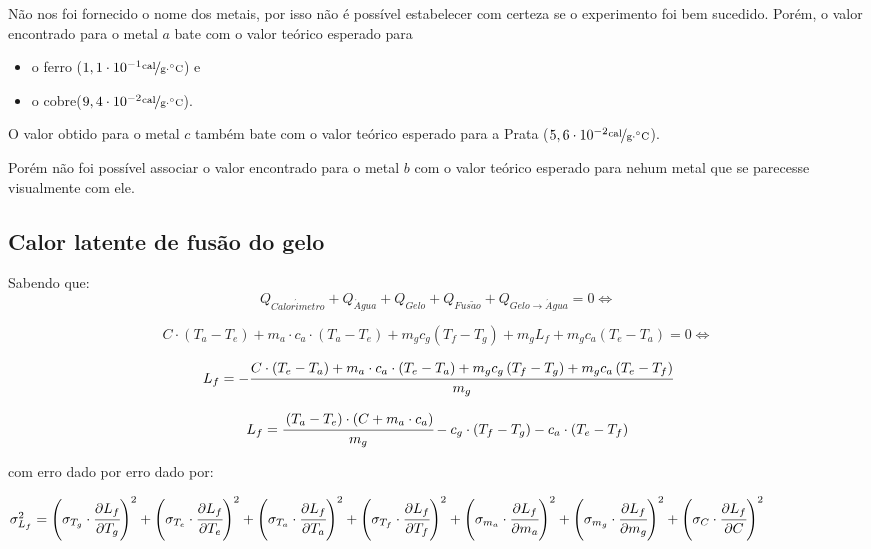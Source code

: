 \documentclass[a4paper]{article}
\begin{document}
				Não nos foi fornecido o nome dos metais, por isso não é possível estabelecer
				com certeza se o experimento foi bem sucedido. Porém, o valor encontrado
				para o metal $a$ bate com o valor teórico esperado para 
				\begin{itemize}
					\item o ferro ($1,1\cdot10^{-1}\unitfrac{cal}{g\cdot^{\circ}C}$) e 
					\item o cobre($9,4\cdot10^{-2}\unitfrac{cal}{g\cdot^{\circ}C}$). 
				\end{itemize}
				O valor obtido para o metal $c$ também bate com o valor teórico esperado
				para a Prata ($5,6\cdot10^{-2}\unitfrac{cal}{g\cdot^{\circ}C}$).

				Porém não foi possível associar o valor encontrado para o metal $b$
				com o valor teórico esperado para nehum metal que se parecesse visualmente
				com ele.

		\subsection{Calor latente de fusão do gelo}

			Sabendo que: 
			\begin{equation}
				Q_{Calor\acute{i}metro}+
				Q_{\acute{A}gua}+Q_{Gelo}+
				Q_{Fus\tilde{a}o}+Q_{Gelo\rightarrow\acute{A}gua}=0 
				\Leftrightarrow
			\end{equation}


			\[
				C\cdot\left(T_{a}-T_{e}\right)+
				m_{a}\cdot c_{a}\cdot\left(T_{a}-T_{e}\right)+
				m_{g}c_{g}\left(T_{f}-T_{g}\right)+m_{g}L_{f}+
				m_{g}c_{a}\left(T_{e}-T_{a}\right)=0
				\Leftrightarrow
			\]


			\[
				L_{f} = - \cfrac{
									C\cdot\left(T_{e}-T_{a}\right)+
									m_{a}\cdot c_{a}\cdot\left(T_{e}-T_{a}\right)+
									m_{g}c_{g}\left(T_{f}-T_{g}\right)+
									m_{g}c_{a}\left(T_{e}-T_{f}\right)
								}
								{m_{g}}
			\]


			\begin{equation}
				L_{f} = \cfrac{\left(T_{a}-T_{e}\right)\cdot\left(C+m_{a}\cdot c_{a}\right)}{m_{g}}-c_{g}\cdot\left(T_{f}-T_{g}\right)-c_{a}\cdot\left(T_{e}-T_{f}\right)
			\end{equation}


			com erro dado por erro dado por:

			$
			\sigma_{L_{f}}^{2}=
				\left(\sigma_{T_{g}}\cdot\cfrac{\partial L_{f}}{\partial T_{g}}\right)^{2}+
				\left(\sigma_{T_{e}}\cdot\cfrac{\partial L_{f}}{\partial T_{e}}\right)^{2}+
				\left(\sigma_{T_{a}}\cdot\cfrac{\partial L_{f}}{\partial T_{a}}\right)^{2}+
				\left(\sigma_{T_{f}}\cdot\cfrac{\partial L_{f}}{\partial T_{f}}\right)^{2}+
				\left(\sigma_{m_{a}}\cdot\cfrac{\partial L_{f}}{\partial m_{a}}\right)^{2}+
				\left(\sigma_{m_{g}}\cdot\cfrac{\partial L_{f}}{\partial m_{g}}\right)^{2}+
				\left(\sigma_{C}\cdot\cfrac{\partial L_{f}}{\partial C}\right)^{2}
			$
\end{document}
